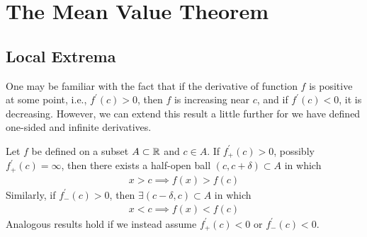 \documentclass[thmcnt=section, 12pt]{my-elegantbook}
\begin{document}

\section{The Mean Value Theorem} 


\subsection{Local Extrema}

\par One may be familiar with the fact that if the derivative of function $f$ is positive at some point, i.e., $f^\prime(c) > 0$, then $f$ is increasing near $c$, and if $f^\prime(c) < 0$, it is decreasing. However, we can extend this result a little further for we have defined one-sided and infinite derivatives.

\begin{theorem} \label{thm:14}
    Let $f$ be defined on a subset $A \subset \mathbb{R}$ and $c \in A$. If $f^\prime_+(c) > 0$, possibly $f^\prime_+(c) = \infty$, then there exists a half-open ball $(c, c+\delta) \subset A$ in which
    \begin{align}
        x > c \implies f(x) > f(c)
        \label{eq:12}
    \end{align}
    Similarly, if $f^\prime_{-}(c) > 0$, then $\exists (c-\delta, c) \subset A$ in which
    \begin{align*}
        x < c \implies f(x) < f(c)
    \end{align*}
    Analogous results hold if we instead assume $f^\prime_{+}(c) < 0$ or $f^\prime_{-}(c) < 0$.
\end{theorem}
\end{document}
